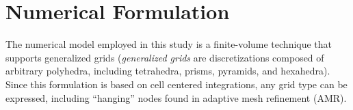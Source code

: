 \section{Numerical Formulation}

The numerical model employed in this study is a finite-volume technique
that supports generalized grids\cite{Koomullil.99} ({\sl generalized grids\/}
are discretizations composed of arbitrary polyhedra, including tetrahedra,
prisms, pyramids, and hexahedra).
Since this formulation is based on
cell centered integrations, any grid type can be expressed, including
``hanging'' nodes found in adaptive mesh refinement (AMR).

